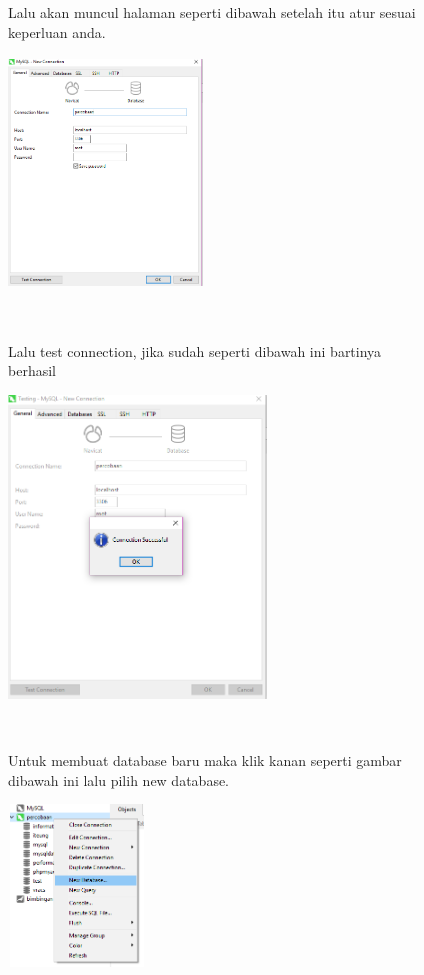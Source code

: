 \documentclass{book}
\begin{document}
\begin{enumerate}
\begin{figure} [ht]
    \end{figure} \begin{figure}
	\item Lalu akan muncul halaman seperti dibawah setelah itu atur sesuai keperluan anda.\\
    \centerline{\includegraphics [width=5.15cm, height=6.17cm]{figures/3.png}}\\
    \item Lalu test connection, jika sudah seperti dibawah ini bartinya berhasil\\
    \centerline{\includegraphics [width=6.85cm, height=8.05cm]{figures/4.png}}\\
    \item Untuk membuat database baru maka klik kanan seperti gambar dibawah ini lalu pilih new database.\\
    \centerline{\includegraphics [width=3.64cm, height=4.29cm]{figures/5.png}}\\
\end{figure}
\end{enumerate}
\end{document}
